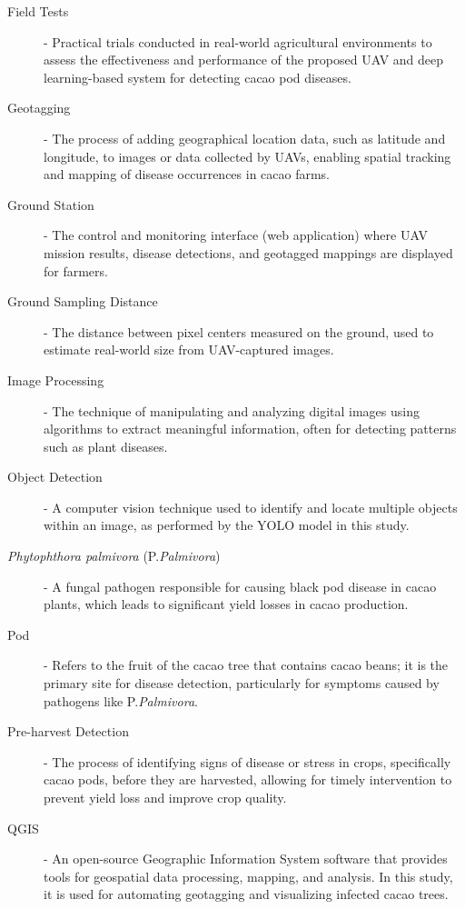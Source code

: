{\begin{description}
	\item[Field Tests] - Practical trials conducted in real-world agricultural environments to assess the effectiveness and performance of the proposed UAV and deep learning-based system for detecting cacao pod diseases.

	\item[Geotagging] - The process of adding geographical location data, such as latitude and longitude, to images or data collected by UAVs, enabling spatial tracking and mapping of disease occurrences in cacao farms.
	
	\item[Ground Station] - The control and monitoring interface (web application) where UAV mission results, disease detections, and geotagged mappings are displayed for farmers.
	
	\item[Ground Sampling Distance] - The distance between pixel centers measured on the ground, used to estimate real-world size from UAV-captured images.

	\item[Image Processing] - The technique of manipulating and analyzing digital images using algorithms to extract meaningful information, often for detecting patterns such as plant diseases.

	\item[Object Detection] - A computer vision technique used to identify and locate multiple objects within an image, as performed by the YOLO model in this study.
	
	\item[\textit{Phytophthora palmivora} (P.\textit{Palmivora})] - A fungal pathogen responsible for causing black pod disease in cacao plants, which leads to significant yield losses in cacao production.

	\item[Pod] - Refers to the fruit of the cacao tree that contains cacao beans; it is the primary site for disease detection, particularly for symptoms caused by pathogens like P.\textit{Palmivora}.

	\item[Pre-harvest Detection] - The process of identifying signs of disease or stress in crops, specifically cacao pods, before they are harvested, allowing for timely intervention to prevent yield loss and improve crop quality.

	\item[QGIS] - An open-source Geographic Information System software that provides tools for geospatial data processing, mapping, and analysis. In this study, it is used for automating geotagging and visualizing infected cacao trees.


\end{description}}
